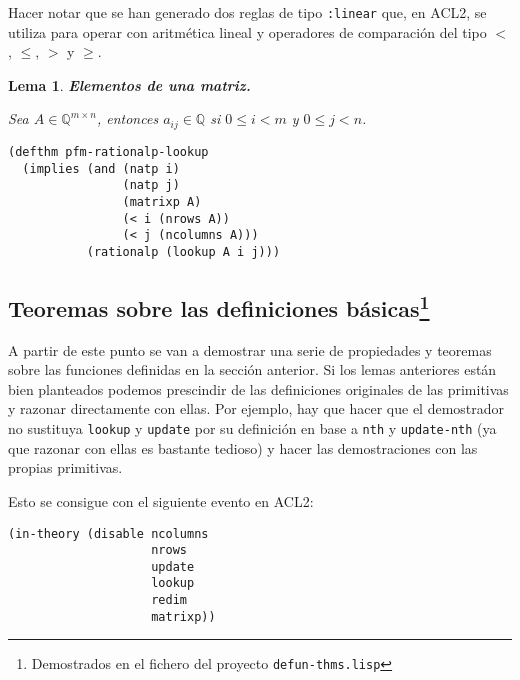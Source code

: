 \documentclass[a4paper,10pt]{article}
\newcommand{\Q}[1]{#1 \in \mathbb{Q}}
\newcommand{\M}[3]{#1 \in \mathbb{Q}^{#2 \times #3}}
\newtheorem{lema}{{Lema}}
\begin{document}
Hacer notar que se han generado dos reglas de tipo \texttt{:linear} que, en ACL2, se utiliza para operar con aritmética lineal y operadores de comparación del tipo $<$, $\leq$, $>$ y $\geq$.

\par \vspace{16pt}

\begin{lema} \textbf{Elementos de una matriz.}\vspace{8pt}\par
Sea $\M{A}{m}{n}$, entonces $\Q{a_{ij}}$ si $0 \leq i < m$ y $0 \leq j < n$. 
\end{lema}

\begin{lstlisting}[language=clips]
(defthm pfm-rationalp-lookup
  (implies (and (natp i)
                (natp j)
                (matrixp A)
                (< i (nrows A))
                (< j (ncolumns A)))
           (rationalp (lookup A i j)))
\end{lstlisting}

\vspace{12pt}
\subsection[Teoremas sobre las definiciones básicas]
           {Teoremas sobre las definiciones básicas\footnote{Demostrados en el fichero del proyecto \texttt{defun-thms.lisp}}}
\vspace{10pt}

A partir de este punto se van a demostrar una serie de propiedades y teoremas sobre las funciones definidas en la sección anterior. Si los lemas anteriores están bien planteados podemos prescindir de las definiciones originales de las primitivas y razonar directamente con ellas. Por ejemplo, hay que hacer que el demostrador no sustituya \texttt{lookup} y \texttt{update} por su definición en base a \texttt{nth} y \texttt{update-nth} (ya que razonar con ellas es bastante tedioso) y hacer las demostraciones con las propias primitivas.

\par \vspace{10pt}

Esto se consigue con el siguiente evento en ACL2:

\par \vspace{10pt}

\begin{lstlisting}[language=clips]
(in-theory (disable ncolumns 
                    nrows 
                    update
                    lookup
                    redim
                    matrixp))
\end{lstlisting}
\end{document}
